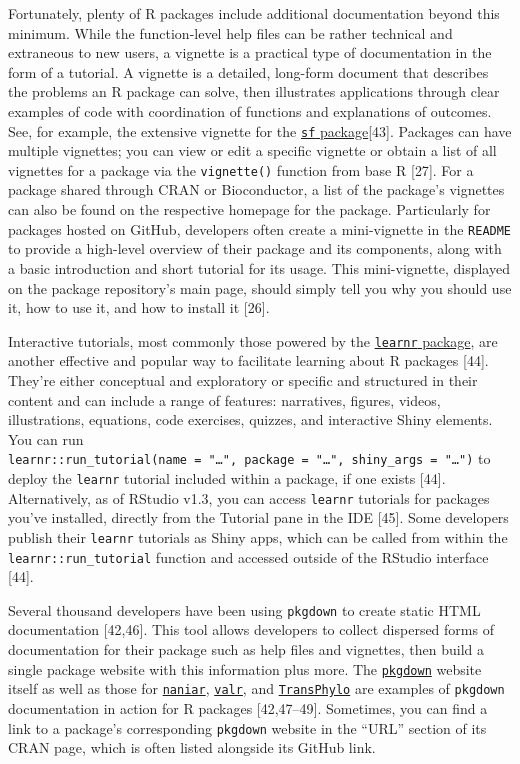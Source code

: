 \documentclass[10pt,letterpaper]{article}
\begin{document}
Fortunately, plenty of R packages include additional documentation
beyond this minimum. While the function-level help files can be rather
technical and extraneous to new users, a vignette is a practical type of
documentation in the form of a tutorial. A vignette is a detailed,
long-form document that describes the problems an R package can solve,
then illustrates applications through clear examples of code with
coordination of functions and explanations of outcomes. See, for
example, the extensive vignette for the
\href{https://cran.r-project.org/web/packages/sf/vignettes/sf1.html}{\texttt{sf}
package}{[}43{]}. Packages can have multiple vignettes; you can view or
edit a specific vignette or obtain a list of all vignettes for a package
via the \texttt{vignette()} function from base R {[}27{]}. For a package
shared through CRAN or Bioconductor, a list of the package's vignettes
can also be found on the respective homepage for the package.
Particularly for packages hosted on GitHub, developers often create a
mini-vignette in the \texttt{README} to provide a high-level overview of
their package and its components, along with a basic introduction and
short tutorial for its usage. This mini-vignette, displayed on the
package repository's main page, should simply tell you why you should
use it, how to use it, and how to install it {[}26{]}.

Interactive tutorials, most commonly those powered by the
\href{https://rstudio.github.io/learnr/}{\texttt{learnr} package}, are
another effective and popular way to facilitate learning about R
packages {[}44{]}. They're either conceptual and exploratory or specific
and structured in their content and can include a range of features:
narratives, figures, videos, illustrations, equations, code exercises,
quizzes, and interactive Shiny elements. You can run
\texttt{learnr::run\_tutorial(name\ =\ "\ldots{}",\ package\ =\ "\ldots{}",\ shiny\_args\ =\ "\ldots{}")}
to deploy the \texttt{learnr} tutorial included within a package, if one
exists {[}44{]}. Alternatively, as of RStudio v1.3, you can access
\texttt{learnr} tutorials for packages you've installed, directly from
the Tutorial pane in the IDE {[}45{]}. Some developers publish their
\texttt{learnr} tutorials as Shiny apps, which can be called from within
the \texttt{learnr::run\_tutorial} function and accessed outside of the
RStudio interface {[}44{]}.

Several thousand developers have been using \texttt{pkgdown} to create
static HTML documentation {[}42,46{]}. This tool allows developers to
collect dispersed forms of documentation for their package such as help
files and vignettes, then build a single package website with this
information plus more. The
\href{https://pkgdown.r-lib.org/}{\texttt{pkgdown}} website itself as
well as those for
\href{http://naniar.njtierney.com/index.html}{\texttt{naniar}},
\href{https://rnabioco.github.io/valr/}{\texttt{valr}}, and
\href{https://xavierdidelot.github.io/TransPhylo/articles/TransPhylo.html}{\texttt{TransPhylo}}
are examples of \texttt{pkgdown} documentation in action for R packages
{[}42,47--49{]}. Sometimes, you can find a link to a package's
corresponding \texttt{pkgdown} website in the ``URL'' section of its
CRAN page, which is often listed alongside its GitHub link.
\end{document}
